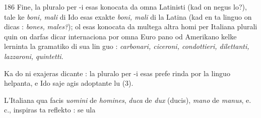 \begin{VUpage}[190]{186}
Fine, la pluralo per -i esas konocata da omna Latinisti\nl
(kad on negus lo?), tale ke \textit{boni, mali} di Ido esas exakte\nl
\textit{boni, mali} di la Latina (kad en ta linguo on dicas : \textit{bones,}\nl
\textit{males?}); ol esas konocata da multega altra homi per Italiana\nl
plurali quin on darfas dicar internaciona por omna Euro\cc
pano od Amerikano kelke lerninta la gramatiko di sua lin\cc
guo : \textit{carbonari, ciceroni, condottieri, dilettanti, lazzaroni,}\nl
\textit{quintetti}.

Ka do ni exajeras dicante : la pluralo per -i esas prefe\cc
rinda por la linguo helpanta, e Ido saje agis adoptante lu (3).\parplein

L'Italiana qua facis \textit{uomini} de \textit{homines}, \textit{duca} de \textit{dux}\nl
(ducis), \textit{mano} de \textit{manus}, e. c., inspiras ta reflekto : se ula\nl
\end{VUpage}

